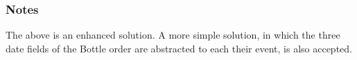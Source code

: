 \subsubsection*{Notes}
The above is an enhanced solution. A more simple solution, in which the three date fields of the Bottle order are abstracted to each their event, is also accepted.